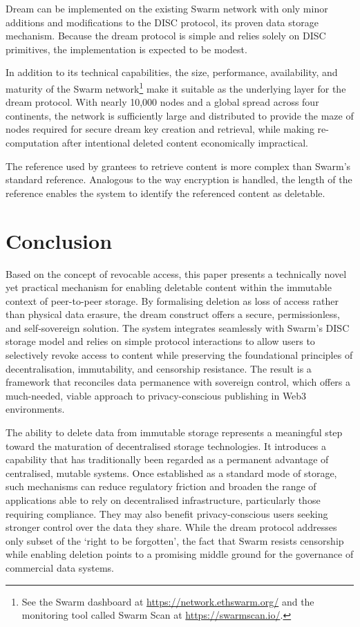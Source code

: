 \documentclass[singlecolumn]{acmart}
\begin{document}
Dream can be implemented on the existing Swarm network with only minor additions and modifications to the DISC protocol, its proven data storage mechanism. Because the dream protocol is simple and relies solely on DISC primitives, the implementation is expected to be modest.

In addition to its technical capabilities, the size, performance, availability, and maturity of the Swarm network\footnote{See the Swarm dashboard at \url{https://network.ethswarm.org/} and the monitoring tool called Swarm Scan at \url{https://swarmscan.io/}.}  make it suitable as the underlying layer for the dream protocol. With nearly 10,000 nodes and a global spread across four continents, the network is sufficiently large and distributed to provide the maze of nodes required for secure dream key creation and retrieval, while making re-computation after intentional deleted content economically impractical. 

The reference used by grantees to retrieve content is more complex than Swarm's standard reference. Analogous to the way encryption is handled, the length of the reference enables the system to identify the referenced content as deletable.

\section{Conclusion}\label{sec:conclusion}
Based on the concept of revocable access, this paper presents a technically novel yet practical mechanism for enabling deletable content within the immutable context of peer-to-peer storage. By formalising deletion as loss of access rather than physical data erasure, the dream construct offers a secure, permissionless, and self-sovereign solution. The system integrates seamlessly with Swarm’s DISC storage model and relies on simple protocol interactions to allow users to selectively revoke access to content while preserving the foundational principles of decentralisation, immutability, and censorship resistance. The result is a framework that reconciles data permanence with sovereign control, which offers a much-needed, viable approach to privacy-conscious publishing in Web3 environments.


The ability to delete data from immutable storage represents a meaningful step toward the maturation of decentralised storage technologies. It introduces a capability that has traditionally been regarded as a permanent advantage of centralised, mutable systems. Once established as a standard mode of storage, such mechanisms can reduce regulatory friction and broaden the range of applications able to rely on decentralised infrastructure, particularly those requiring compliance. They may also benefit privacy-conscious users seeking stronger control over the data they share.
While the dream protocol addresses only subset of the `right to be forgotten', the fact that Swarm resists censorship while enabling deletion points to a promising middle ground for the governance of commercial data systems.
\end{document}
